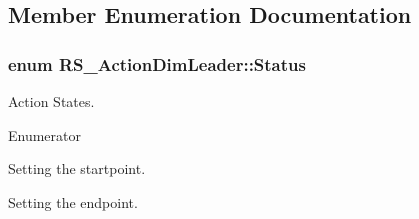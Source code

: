 \subsection{Member Enumeration Documentation}
\hypertarget{classRS__ActionDimLeader_a2b2ce1799909625438473405ce3e25ff}{
\subsubsection[{Status}]{\setlength{\rightskip}{0pt plus 5cm}enum {\bf R\-S\-\_\-\-Action\-Dim\-Leader\-::\-Status}}}\label{classRS__ActionDimLeader_a2b2ce1799909625438473405ce3e25ff}
Action States. \begin{Desc}
\item[Enumerator]\par
\begin{description}
\item[{\em 
\hypertarget{classRS__ActionDimLeader_a2b2ce1799909625438473405ce3e25ffa7411e495c561471bbc867b59d3de9137}{Set\-Startpoint}\label{classRS__ActionDimLeader_a2b2ce1799909625438473405ce3e25ffa7411e495c561471bbc867b59d3de9137}
}]Setting the startpoint. \item[{\em 
\hypertarget{classRS__ActionDimLeader_a2b2ce1799909625438473405ce3e25ffa6b31b70f1aff3c4f7ef08bbac5319c82}{Set\-Endpoint}\label{classRS__ActionDimLeader_a2b2ce1799909625438473405ce3e25ffa6b31b70f1aff3c4f7ef08bbac5319c82}
}]Setting the endpoint. \end{description}
\end{Desc}


